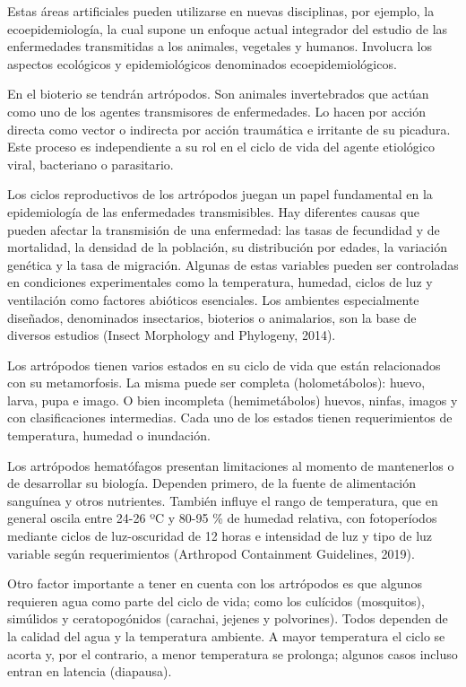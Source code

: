 \documentclass[
11pt, %
]{charter}
\begin{document}
Estas áreas artificiales pueden utilizarse en nuevas disciplinas, por ejemplo, la ecoepidemiología, la cual supone un enfoque actual integrador del estudio de las enfermedades transmitidas a los animales, vegetales y humanos. Involucra los aspectos ecológicos y epidemiológicos denominados ecoepidemiológicos.

En el bioterio se tendrán artrópodos. Son animales invertebrados que actúan como uno de los agentes transmisores de enfermedades. Lo hacen por acción directa como vector o indirecta por acción traumática e irritante de su picadura. Este proceso es independiente a su rol en el ciclo de vida del agente etiológico viral, bacteriano o parasitario.

Los ciclos reproductivos de los artrópodos juegan un papel fundamental en la epidemiología de las enfermedades transmisibles. Hay diferentes causas que pueden afectar la transmisión de una enfermedad: las tasas de fecundidad y de mortalidad, la densidad de la población, su distribución por edades, la variación genética y la tasa de migración.  Algunas de estas variables pueden ser controladas en condiciones experimentales como la temperatura, humedad, ciclos de luz y ventilación como factores abióticos esenciales. Los ambientes especialmente diseñados, denominados insectarios, bioterios o animalarios, son la base de diversos estudios (Insect Morphology and Phylogeny, 2014).

Los artrópodos tienen varios estados en su ciclo de vida que están relacionados con su metamorfosis. La misma puede ser completa (holometábolos): huevo, larva, pupa e imago. O bien incompleta (hemimetábolos) huevos, ninfas, imagos y con clasificaciones intermedias.  Cada uno de los estados tienen requerimientos de temperatura, humedad o inundación.  

Los artrópodos hematófagos presentan limitaciones al momento de mantenerlos o de desarrollar su biología. Dependen primero, de la fuente de alimentación sanguínea y otros nutrientes.  También influye el rango de temperatura, que en general oscila entre 24-26 ºC y 80-95 \% de humedad relativa, con fotoperíodos mediante ciclos de luz-oscuridad de 12 horas e intensidad de luz y tipo de luz variable según requerimientos (Arthropod Containment Guidelines, 2019).

Otro factor importante a tener en cuenta con los artrópodos es que algunos requieren agua como parte del ciclo de vida; como los culícidos (mosquitos), simúlidos y ceratopogónidos (carachai, jejenes y polvorines). Todos dependen de la calidad del agua y la temperatura ambiente. A mayor temperatura el ciclo se acorta y, por el contrario, a menor temperatura se prolonga; algunos casos incluso entran en latencia (diapausa).
\end{document}
